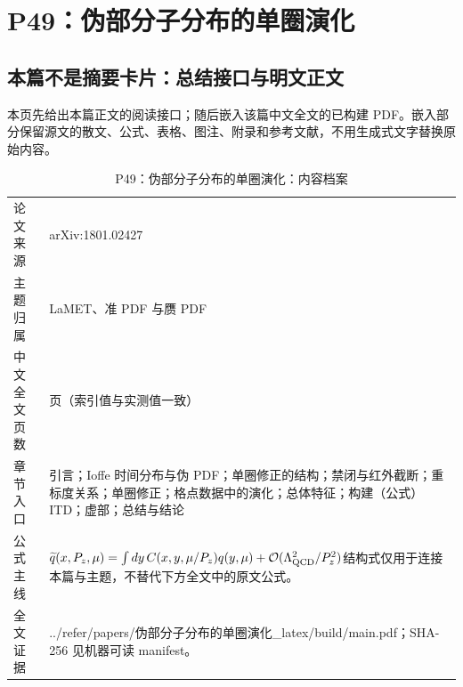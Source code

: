 \documentclass[UTF8,11pt,oneside]{ctexbook}
\begin{document}
\chapter{P49：伪部分子分布的单圈演化}
\section*{本篇不是摘要卡片：总结接口与明文正文}
本页先给出本篇正文的阅读接口；随后嵌入该篇中文全文的已构建 PDF。嵌入部分保留源文的散文、公式、表格、图注、附录和参考文献，不用生成式文字替换原始内容。
\begin{table}[htbp]
  \centering
  \caption{P49：伪部分子分布的单圈演化：内容档案}
  \small
  \begin{tabularx}{0.96\textwidth}{@{}p{3.3cm}>{\raggedright\arraybackslash}X@{}}
    \toprule
    论文来源 & arXiv:1801.02427 \\
    主题归属 & LaMET、准 PDF 与赝 PDF \\
    中文全文页数 & 14 页（索引值与实测值一致） \\
    章节入口 & 引言；Ioffe 时间分布与伪 PDF；单圈修正的结构；禁闭与红外截断；重标度关系；单圈修正；格点数据中的演化；总体特征；构建（公式）ITD；虚部；总结与结论 \\
    公式主线 & $\widetilde q(x,P_z,\mu)=\int dy\,C(x,y,\mu/P_z)q(y,\mu)+\mathcal O(\Lambda_{\rm QCD}^{2}/P_z^{2})$\newline\scriptsize 结构式仅用于连接本篇与主题，不替代下方全文中的原文公式。 \\
    全文证据 & ../\allowbreak{}refer/\allowbreak{}papers/\allowbreak{}伪部分子分布的单圈演化\_\allowbreak{}latex/\allowbreak{}build/\allowbreak{}main.pdf；SHA-256 见机器可读 manifest。 \\
    \bottomrule
  \end{tabularx}
\end{table}
\end{document}
